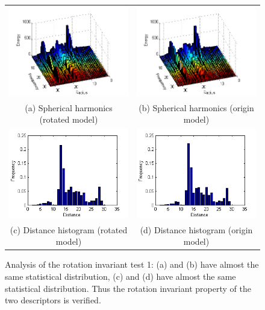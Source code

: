 \begin{enumerate}
\begin{figure}
\begin{center}
\begin{tabular}{cc}   %
   \includegraphics[width=0.45\linewidth]{rotationinvariant_test_SH10_rotated} & 
   \includegraphics[width=0.45\linewidth]{rotationinvariant_test_SH10_origin}  \\
   (a) Spherical harmonics (rotated model) & (b) Spherical harmonics (origin model) \\
   \includegraphics[width=0.45\linewidth]{rotationinvariant_test_DH10_rotated} &
   \includegraphics[width=0.45\linewidth]{rotationinvariant_test_DH10_origin}  \\
   (c) Distance histogram (rotated model) & (d) Distance histogram (origin model)\\
\end{tabular}
\caption{Analysis of the rotation invariant test 1: (a) and (b) have almost the same statistical distribution, (c) and (d) have almost the same statistical distribution. Thus the rotation invariant property of the two descriptors is verified.} 
  \label{rotationinvarianttest_analysis1}
\end{center}
\end{figure}


\end{enumerate}
